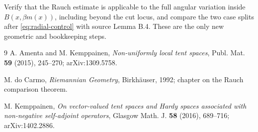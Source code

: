 \documentclass[11pt]{article}
\begin{document}
Verify that the Rauch estimate is applicable to the full angular variation
inside $B(x,\beta m(x))$, including beyond the cut locus, and compare the
two case splits after \eqref{eq:radial-control} with source Lemma B.4.  These
are the only new geometric and bookkeeping steps.

\begin{thebibliography}{9}
\small
{}
A. Amenta and M. Kemppainen,
\emph{Non-uniformly local tent spaces}, Publ. Mat. \textbf{59} (2015),
245--270; arXiv:1309.5758.

M. do Carmo, \emph{Riemannian Geometry}, Birkh\"auser, 1992; chapter on the
Rauch comparison theorem.

M. Kemppainen, \emph{On vector-valued tent spaces and Hardy spaces
associated with non-negative self-adjoint operators}, Glasgow Math. J.
\textbf{58} (2016), 689--716; arXiv:1402.2886.
\end{thebibliography}
\end{document}
